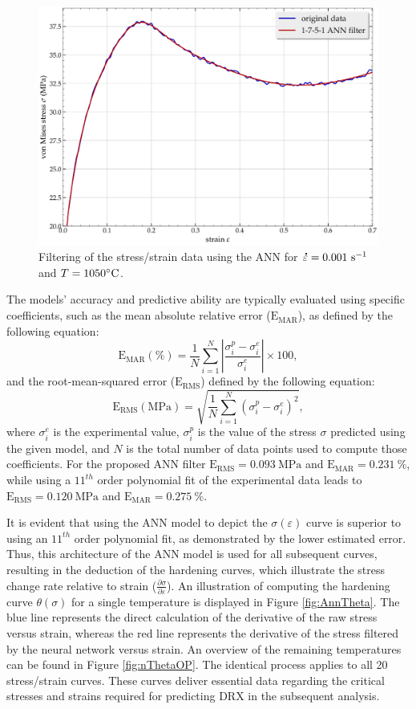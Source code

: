 \documentclass[metals,article,submit,pdftex,moreauthors]{Definitions/mdpi}
\DeclareRobustCommand{\mdot}[1]{\accentset{\mbox{\bfseries .}}{#1}}
\DeclareRobustCommand{\RMSE}{\text{E}_\text{RMS}}
\DeclareRobustCommand{\MARE}{\text{E}_\text{MAR}}
\DeclareRobustCommand{\ps}{\text{s}^{-1}}
\DeclareRobustCommand{\MPa}{\text{MPa}}
\begin{document}
\begin{figure}[H]
\centering
\includegraphics[width=0.7\columnwidth]{Figures/AnnFit}
\caption{Filtering of the stress/strain data using the ANN for $\mdot\varepsilon=0.001~\ps$ and $T=1050\celsius$.}
\label{fig:AnnFit}
\end{figure}
The models' accuracy and predictive ability are typically evaluated using specific coefficients, such as the mean absolute relative error ($\MARE$), as defined by the following equation:
\begin{equation}
\MARE(\%) = \frac{1}{N} \sum_{i=1}^{N}{\left|\frac{\sigma_i^p -\sigma_i^e}{\sigma_i^e}\right|} \times 100, \label{eq:AARE}
\end{equation}
and the root-mean-squared error ($\RMSE$) defined by the following equation:
\begin{equation}
\RMSE (\MPa) = \sqrt{\frac{1}{N} \sum_{i=1}^{N} \left(\sigma_i^p - \sigma_i^e\right)^2}, \label{eq:RMSE}
\end{equation}
where $\sigma_i^e$ is the experimental value, $\sigma_i^p$ is the value of the stress $\sigma$ predicted using the given model, and $N$ is the total number of data points used to compute those coefficients.
For the proposed ANN filter $\RMSE=0.093~\MPa$ and $\MARE=0.231~\%$, while using a $11^{th}$ order polynomial fit of the experimental data leads to $\RMSE=0.120~\MPa$ and $\MARE=0.275~\%$.

It is evident that using the ANN model to depict the $\sigma(\varepsilon)$ curve is superior to using an $11^{th}$ order polynomial fit, as demonstrated by the lower estimated error.
Thus, this architecture of the ANN model is used for all subsequent curves, resulting in the deduction of the hardening curves, which illustrate the stress change rate relative to strain ($\frac{\partial \sigma}{\partial \varepsilon}$).
An illustration of computing the hardening curve $\theta(\sigma)$ for a single temperature is displayed in Figure \ref{fig:AnnTheta}.
The blue line represents the direct calculation of the derivative of the raw stress versus strain, whereas the red line represents the derivative of the stress filtered by the neural network versus strain.
An overview of the remaining temperatures can be found in Figure \ref{fig:nThetaOP}.
The identical process applies to all 20 stress/strain curves.
These curves deliver essential data regarding the critical stresses and strains required for predicting DRX in the subsequent analysis.
\end{document}
